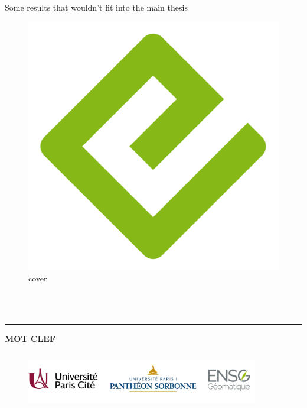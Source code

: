 \documentclass[
  12pt,
  a4paperpaper,
]{book}
\begin{document}
Some results that wouldn't fit into the main thesis

\begin{figure}

{\centering \includegraphics{./cover.png}

}

\caption{cover}

\end{figure}


\backmatter

\cleardoublepage
{}  
\pagestyle{empty}

\noindent
\textbf{\Large\MyTitle} \\

\noindent
\textbf{\textit{\MyAuthor}} \\
\noindent
\MyDate

\vspace{3mm}


\noindent
\rule{\textwidth}{0.7pt}


\vspace{5mm}




\vspace{10mm}


\noindent
\textbf{MOT CLEF}\\



\begin{figure}[b]

\centerline{\includegraphics[width=4in,height=1in]{figures/logos/logos3.jpg}}
\end{figure}



\clearpage

\restoregeometry
\end{document}
